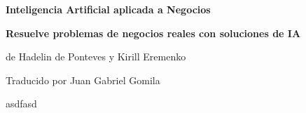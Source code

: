 
\begin{titlepage}

\begin{center}

\Huge \textbf{Inteligencia Artificial aplicada a Negocios}

\Large \textbf{Resuelve problemas de negocios reales con soluciones de IA}

\large de Hadelin de Ponteves y Kirill Eremenko

\large Traducido por Juan Gabriel Gomila


\end{center}



asdfasd





\end{titlepage}
